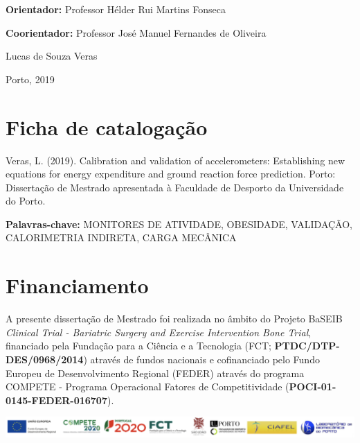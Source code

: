 \documentclass[12pt]{article}
\begin{document}
\vspace{\fill}

\noindent \textbf{Orientador:} Professor Hélder Rui Martins Fonseca

\noindent \textbf{Coorientador:} Professor José Manuel Fernandes de Oliveira

\medskip

\begin{center}
Lucas de Souza Veras

Porto, 2019
\end{center}
\thispagestyle{empty}

\pagebreak

\section*{\hfil Ficha de catalogação \hfil}

\vspace{\fill}

\noindent Veras, L. (2019). Calibration and validation of accelerometers: Establishing new equations for energy expenditure and ground reaction force prediction. Porto: Dissertação de Mestrado apresentada à Faculdade de Desporto da Universidade do Porto.

\bigskip

\noindent \textbf{Palavras-chave:} MONITORES DE ATIVIDADE, OBESIDADE, VALIDAÇÃO, CALORIMETRIA INDIRETA, CARGA MECÂNICA

\pagebreak

\section*{\hfil Financiamento \hfil}

\vspace{\fill}

\noindent A presente dissertação de Mestrado foi realizada no âmbito do Projeto BaSEIB \textit{Clinical Trial - Bariatric Surgery and Exercise Intervention Bone Trial}, financiado pela Fundação para a Ciência e a Tecnologia (FCT; \textbf{PTDC/DTP-DES/0968/2014}) através de fundos nacionais e cofinanciado pelo Fundo Europeu de Desenvolvimento Regional (FEDER) através do programa COMPETE - Programa Operacional Fatores de Competitividade (\textbf{POCI-01-0145-FEDER-016707}).

\vspace{2em}

\begin{center}
\includegraphics[width=\columnwidth]{figs/funding.png}
\end{center}
\end{document}
